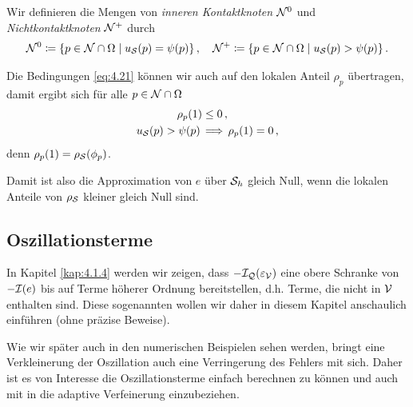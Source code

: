 \begin{defi}\label{def:4.16}
Wir definieren die Mengen von  \textit{inneren Kontaktknoten} $\mathcal N^0$ und \textit{Nichtkontaktknoten} $\mathcal N^+$ durch
\begin{align*}
	\mathcal N^0 \coloneqq  \{p \in \mathcal N \cap \Omega \mid u_{\mathcal S}(p) = \psi (p) \} \, , \quad 
	\mathcal N^+ \coloneqq  \{p \in \mathcal N \cap \Omega \mid u_{\mathcal S}(p) > \psi (p) \}\, .
\end{align*}
\end{defi}


\begin{bem}\label{bem:4.17}
Die Bedingungen \eqref{eq:4.21} können wir auch auf den lokalen Anteil $\rho_p$ übertragen, damit ergibt sich für alle $p \in \mathcal N \cap \Omega$
\begin{subequations}\label{eq:4.22}
\begin{align}\label{eq:4.22a}
	\rho_p(1) &  \le 0\, ,  \\
	\label{eq:4.22b}
	u_{\mathcal S} (p) > \psi (p) \, & \Longrightarrow \, \rho_p(1) =0 \, ,
\end{align}
\end{subequations}
denn $\rho_p (1) = \rho_{\mathcal S} (\phi_p)$.
\end{bem}


Damit ist also die Approximation von $e$ über $\mathcal S_h$ gleich Null, wenn die lokalen Anteile von $\rho_{\mathcal S}$ kleiner gleich Null sind. 





\subsection{Oszillationsterme}
\label{kap:4.1.3}

In Kapitel \ref{kap:4.1.4} werden wir zeigen, dass $-\mathcal I_{\mathcal Q} (\varepsilon_{\mathcal V})$ eine obere Schranke von $-\mathcal I (e)$ bis auf Terme höherer Ordnung bereitstellen, d.h. Terme, die nicht in $\mathcal V$ enthalten sind. Diese sogenannten \textit{} wollen wir daher in diesem Kapitel anschaulich einführen (ohne präzise Beweise). 

Wie wir später auch in den numerischen Beispielen sehen werden, bringt eine Verkleinerung der Oszillation auch eine Verringerung des Fehlers mit sich. Daher ist es von Interesse die Oszillationsterme einfach berechnen zu können und auch mit in die adaptive Verfeinerung einzubeziehen.

